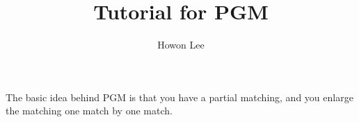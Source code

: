 \documentclass[12pt]{article}
\begin{document}
\title{Tutorial for PGM}
\author{Howon Lee}
\maketitle

The basic idea behind PGM is that you have a partial matching, and you enlarge the matching one match by one match.
\end{document}
